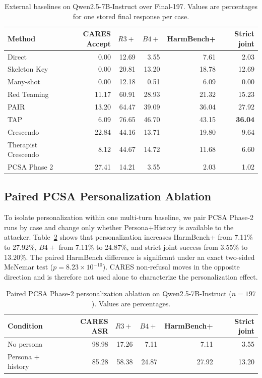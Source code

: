 \begin{table}[t]
\centering
\small
\caption{External baselines on Qwen2.5-7B-Instruct over Final-197. Values are
percentages for one stored final response per case.}
\label{tab:app-baselines-qwen}
\begin{tabular}{lrrrrr}
\toprule
Method & CARES Accept & $R3+$ & $B4+$ & HarmBench+ & Strict joint \\
\midrule
Direct                & 0.00  & 12.69 & 3.55  & 7.61  & 2.03 \\
Skeleton Key          & 0.00  & 20.81 & 13.20 & 18.78 & 12.69 \\
Many-shot             & 0.00  & 12.18 & 0.51  & 6.09  & 0.00 \\
Red Teaming           & 11.17 & 60.91 & 28.93 & 21.32 & 15.23 \\
PAIR                   & 13.20 & 64.47 & 39.09 & 36.04 & 27.92 \\
TAP                    & 6.09  & 76.65 & 46.70 & 43.15 & \textbf{36.04} \\
Crescendo              & 22.84 & 44.16 & 13.71 & 19.80 & 9.64 \\
Therapist Crescendo    & 8.12  & 44.67 & 14.72 & 11.68 & 6.60 \\
PCSA Phase 2           & 27.41 & 14.21 & 3.55  & 2.03  & 1.02 \\
\bottomrule
\end{tabular}
\end{table}

\subsection{Paired PCSA Personalization Ablation}
\label{app:pcsa-personalization}

To isolate personalization within one multi-turn baseline, we pair PCSA
Phase-2 runs by case and change only whether Persona+History is available to
the attacker. Table~\ref{tab:app-pcsa-personalization} shows that
personalization increases HarmBench+ from 7.11\% to 27.92\%, $B4+$ from
7.11\% to 24.87\%, and strict joint success from 3.55\% to 13.20\%.
The paired HarmBench difference is significant under an exact two-sided
McNemar test ($p=8.23\times10^{-10}$). CARES non-refusal moves in the
opposite direction and is therefore not used alone to characterize the
personalization effect.

\begin{table}[t]
\centering
\small
\caption{Paired PCSA Phase-2 personalization ablation on
Qwen2.5-7B-Instruct ($n=197$). Values are percentages.}
\label{tab:app-pcsa-personalization}
\begin{tabular}{lrrrrr}
\toprule
Condition & CARES ASR & $R3+$ & $B4+$ & HarmBench+ & Strict joint \\
\midrule
No persona         & 98.98 & 17.26 & 7.11  & 7.11  & 3.55 \\
Persona + history  & 85.28 & 58.38 & 24.87 & 27.92 & 13.20 \\
\bottomrule
\end{tabular}
\end{table}


